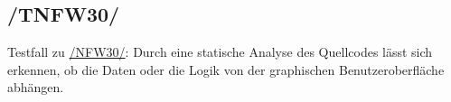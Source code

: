 \subsection*{/TNFW30/}

\label{/TNFW30/} Testfall zu \hyperref[/NFW30/]{/NFW30/}: Durch eine \gls{statische Analyse} des \Gls{Quellcode}s lässt sich erkennen, ob die Daten oder die Logik von der graphischen Benutzeroberfläche abhängen.